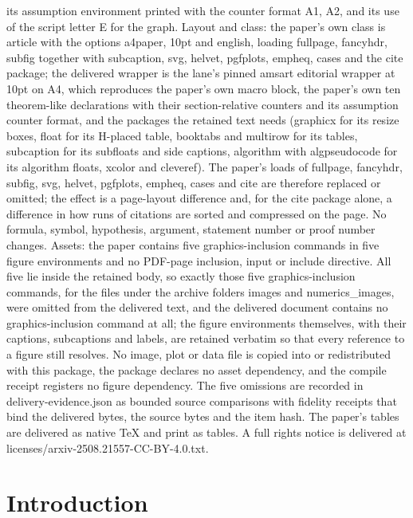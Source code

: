 \documentclass[10pt,a4paper]{amsart}
\begin{document}
its assumption environment printed with the counter format A1, A2, and its use of the script letter E for the graph. Layout and class: the paper's own class is article with the options a4paper, 10pt and english, loading fullpage, fancyhdr, subfig together with subcaption, svg, helvet, pgfplots, empheq, cases and the cite package; the delivered wrapper is the lane's pinned amsart editorial wrapper at 10pt on A4, which reproduces the paper's own macro block, the paper's own ten theorem-like declarations with their section-relative counters and its assumption counter format, and the packages the retained text needs (graphicx for its resize boxes, float for its H-placed table, booktabs and multirow for its tables, subcaption for its subfloats and side captions, algorithm with algpseudocode for its algorithm floats, xcolor and cleveref). The paper's loads of fullpage, fancyhdr, subfig, svg, helvet, pgfplots, empheq, cases and cite are therefore replaced or omitted; the effect is a page-layout difference and, for the cite package alone, a difference in how runs of citations are sorted and compressed on the page. No formula, symbol, hypothesis, argument, statement number or proof number changes. Assets: the paper contains five graphics-inclusion commands in five figure environments and no PDF-page inclusion, input or include directive. All five lie inside the retained body, so exactly those five graphics-inclusion commands, for the files under the archive folders images and numerics\_images, were omitted from the delivered text, and the delivered document contains no graphics-inclusion command at all; the figure environments themselves, with their captions, subcaptions and labels, are retained verbatim so that every reference to a figure still resolves. No image, plot or data file is copied into or redistributed with this package, the package declares no asset dependency, and the compile receipt registers no figure dependency. The five omissions are recorded in delivery-evidence.json as bounded source comparisons with fidelity receipts that bind the delivered bytes, the source bytes and the item hash. The paper's tables are delivered as native TeX and print as tables. A full rights notice is delivered at licenses/arxiv-2508.21557-CC-BY-4.0.txt.
\section{Introduction}
\end{document}
